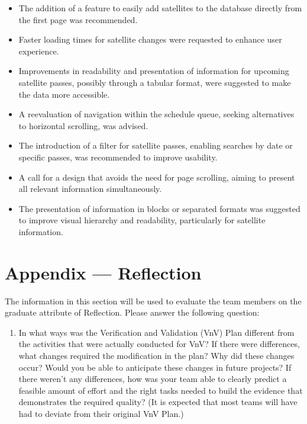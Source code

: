 \documentclass[12pt, titlepage]{article}
\begin{document}
\begin{itemize}
\begin{itemize}
\begin{itemize}
            \item The addition of a feature to easily add satellites to the database directly from the first page was recommended.
            \item Faster loading times for satellite changes were requested to enhance user experience.
            \item Improvements in readability and presentation of information for upcoming satellite passes, possibly through a tabular format, were suggested to make the data more accessible.
            \item A reevaluation of navigation within the schedule queue, seeking alternatives to horizontal scrolling, was advised.
            \item The introduction of a filter for satellite passes, enabling searches by date or specific passes, was recommended to improve usability.
            \item A call for a design that avoids the need for page scrolling, aiming to present all relevant information simultaneously.
            \item The presentation of information in blocks or separated formats was suggested to improve visual hierarchy and readability, particularly for satellite information.
        \end{itemize}
    \end{itemize}
\end{itemize}









\newpage{}
\section*{Appendix --- Reflection}

The information in this section will be used to evaluate the team members on the
graduate attribute of Reflection.  Please answer the following question:

\begin{enumerate}
  \item In what ways was the Verification and Validation (VnV) Plan different
  from the activities that were actually conducted for VnV?  If there were
  differences, what changes required the modification in the plan?  Why did
  these changes occur?  Would you be able to anticipate these changes in future
  projects?  If there weren't any differences, how was your team able to clearly
  predict a feasible amount of effort and the right tasks needed to build the
  evidence that demonstrates the required quality?  (It is expected that most
  teams will have had to deviate from their original VnV Plan.)
\end{enumerate}
\end{document}
